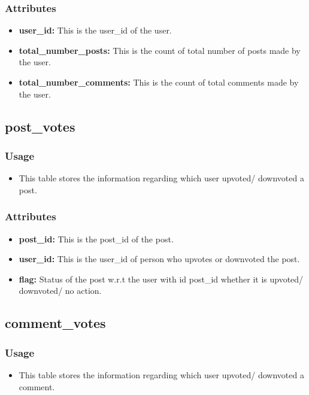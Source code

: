 \documentclass[12pt,a4paper]{article}
\begin{document}
\subsubsection{Attributes}
\begin{itemize}
	\item \textbf{user\_id:} This is the user\_id of the user.
	\item \textbf{total\_number\_posts:} This is the count of total number of posts made by the user.
	\item \textbf{total\_number\_comments:} This is the count of total comments made by the user.
\end{itemize}

	\subsection{post\_votes}
		\subsubsection{Usage}
\begin{itemize}
	\item This table stores the information regarding which user upvoted/ downvoted a post.
\end{itemize}
\subsubsection{Attributes}
\begin{itemize}
	\item \textbf{post\_id:} This is the post\_id of the post.
	\item \textbf{user\_id:} This is the user\_id of person who upvotes or downvoted the post.
	\item \textbf{flag:} Status of the post w.r.t the user with id post\_id whether it is upvoted/ downvoted/ no action.
\end{itemize}

	\subsection{comment\_votes}	
		\subsubsection{Usage}
\begin{itemize}
	\item This table stores the information regarding which user upvoted/ downvoted a comment.
\end{itemize}
\end{document}
